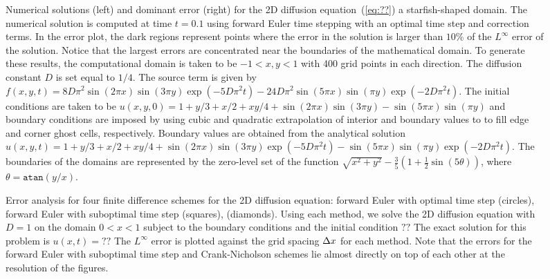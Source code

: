\documentclass[oneeqnum,onefignum,onetabnum,onethmnum]{siamltex}
\begin{document}
\begin{figure}[htb]
\begin{center}
\caption{Numerical solutions (left) and dominant error (right) for the 2D 
diffusion equation~(\ref{eq:??}) a starfish-shaped domain.  The numerical 
solution is computed at time $t = 0.1$ using forward Euler time stepping 
with an optimal time step and correction terms.  In the error plot, the dark 
regions represent points where the error in the solution is larger than 
$10$\% of the $L^\infty$ error of the solution.  Notice that the largest 
errors are concentrated near the boundaries of the mathematical domain.  To 
generate these results, the computational domain is taken to be 
$-1 < x,y < 1$ with 400 grid points in each direction.  The diffusion 
constant $D$ is set equal to $1/4$.  The source term is given by
$f(x,y,t) = 8 D \pi^2 \sin(2 \pi x) \sin(3 \pi y) 
            \exp\left(-5 D \pi^2 t\right)
          - 24 D \pi^2 \sin(5 \pi x) \sin(\pi y) 
            \exp \left(-2 D \pi^2 t \right).
$
The initial conditions are taken to be 
$u(x,y,0) = 1 + y/3 + x/2 + xy/4 
          + \sin(2 \pi x) \sin(3 \pi y) 
          - \sin(5 \pi x) \sin(\pi y)
$
and boundary conditions are imposed by using cubic and quadratic 
extrapolation of interior and boundary values to to fill edge and corner 
ghost cells, respectively.  Boundary values are obtained from the 
analytical solution
$u(x,y,t) = 1 + y/3 + x/2 + xy/4 
              + \sin(2 \pi x) \sin(3 \pi y) \exp(-5 D \pi^2 t) 
              - \sin(5 \pi x) \sin(\pi y) \exp(-2 D \pi^2 t)$.
The boundaries of the domains are represented by the zero-level 
set of the function
$\sqrt{x^2 + y^2} - \frac{3}{5} \left(1 + \frac{1}{2}\sin(5 \theta) \right)$, 
where $\theta = \mathtt{atan}\left( y/x \right)$.
}
\label{fig:diffusion_eqn_2d_starfish_domain}
\end{center}
\end{figure}

\begin{figure}[htb]
\begin{center}
\caption{Error analysis for four finite difference schemes 
for the 2D diffusion equation: forward Euler with optimal time step (circles), 
forward Euler with suboptimal time step (squares), 
(diamonds).  Using each method, we solve the 2D diffusion equation with 
$D = 1$ on the domain $0 < x < 1$ subject to the boundary conditions 
and the initial condition
$??$
The exact solution for this problem is
$u(x,t) = ??$
The $L^\infty$ error is plotted against the grid spacing $\Delta x$ for each 
method.  Note that the errors for the forward Euler with suboptimal time 
step and Crank-Nicholson schemes lie almost directly on top of each other
at the resolution of the figures.
}
\label{fig:diffusion_eqn_2d_starfish_error}
\end{center}
\end{figure}
\end{document}
